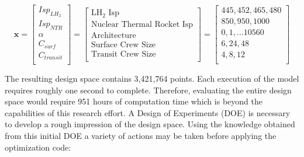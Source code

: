 \documentclass[]{aiaa-pretty}
\begin{document}
\begin{equation*}
\mathbf{x}=
\begin{bmatrix}
Isp_{LH_2}\\
Isp_{NTR}\\
\alpha\\
C_{surf}\\
C_{transit}\\
\end{bmatrix}
=
\begin{bmatrix}
\mbox{LH}_2\mbox{ Isp}\\
\mbox{Nuclear Thermal Rocket Isp}\\
\mbox{Architecture}\\
\mbox{Surface Crew Size}\\
\mbox{Transit Crew Size}\\
\end{bmatrix}
=
\begin{bmatrix}
445,452,465,480\\
850,950,1000\\
0,1,...10560\\
6,24,48\\
4,8,12\\
\end{bmatrix}
\end{equation*}

The resulting design space contains 3,421,764 points. Each execution of the model requires roughly
one second to complete. Therefore, evaluating the entire design space would require 951 hours of computation time which is beyond the capabilities of this research effort. A Design of Experiments (DOE) is necessary to develop a rough impression of the design space. Using the knowledge obtained from this initial DOE a variety of actions may be taken before applying the optimization code:
\end{document}
